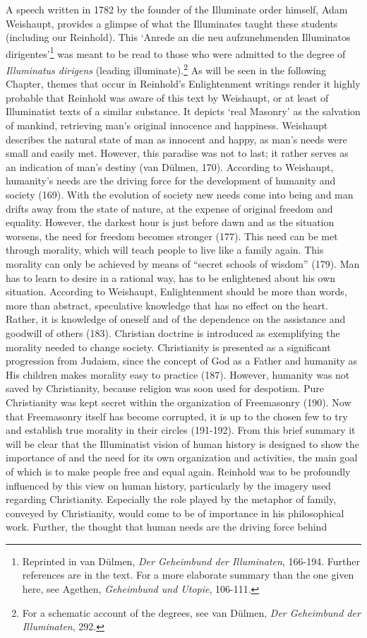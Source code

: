  A speech written in 1782 by the founder of the Illuminate order himself, Adam Weishaupt, provides a glimpse of what the Illuminates taught these students (including our Reinhold). This `Anrede an die neu aufzunehmenden Illuminatos dirigentes'\footnote{ Reprinted in van D\"{u}lmen, \textit{Der Geheimbund der Illuminaten}, 166{-}194. Further references are in the text. For a more elaborate summary than the one given here, see Agethen, \textit{Geheimbund und Utopie}, 106{-}111.} was meant to be read to those who were admitted to the degree of \textit{Illuminatus dirigens} (leading illuminate).\footnote{ For a schematic account of the degrees, see van D\"{u}lmen, \textit{Der Geheimbund der Illuminaten}, 292. } As will be seen in the following Chapter, themes that occur in Reinhold's Enlightenment writings render it highly probable that Reinhold was aware of this text by Weishaupt, or at least of Illuminatist texts of a similar substance. It depicts `real Masonry' as the salvation of mankind, retrieving man's original innocence and happiness. Weishaupt describes the natural state of man as innocent and happy, as man's needs were small and easily met. However, this paradise was not to last; it rather serves as an indication of man's destiny (van D\"{u}lmen, 170). According to Weishaupt, humanity's needs are the driving force for the development of humanity and society (169). With the evolution of society new needs come into being and man drifts away from the state of nature, at the expense of original freedom and equality. However, the darkest hour is just before dawn and as the situation worsens, the need for freedom becomes stronger (177). This need can be met through morality, which will teach people to live like a family again. This morality can only be achieved by means of ``secret schools of wisdom'' (179). Man has to learn to desire in a rational way, has to be enlightened about his own situation. According to Weishaupt, Enlightenment should be more than words, more than abstract, speculative knowledge that has no effect on the heart. Rather, it is knowledge of oneself and of the dependence on the assistance and goodwill of others (183). Christian doctrine is introduced as exemplifying the morality needed to change society. Christianity is presented as a significant progression from Judaism, since the concept of God as a Father and humanity as His children makes morality easy to practice (187). However, humanity was not saved by Christianity, because religion was soon used for despotism. Pure Christianity was kept secret within the organization of Freemasonry (190). Now that Freemasonry itself has become corrupted, it is up to the chosen few to try and establish true morality in their circles (191{-}192). From this brief summary it will be clear that the Illuminatist vision of human history is designed to show the importance of and the need for its own organization and activities, the main goal of which is to make people free and equal again. Reinhold was to be profoundly influenced by this view on human history, particularly by the imagery used regarding Christianity. Especially the role played by the metaphor of family, conveyed by Christianity, would come to be of importance in his philosophical work. Further, the thought that human needs are the driving force behind 